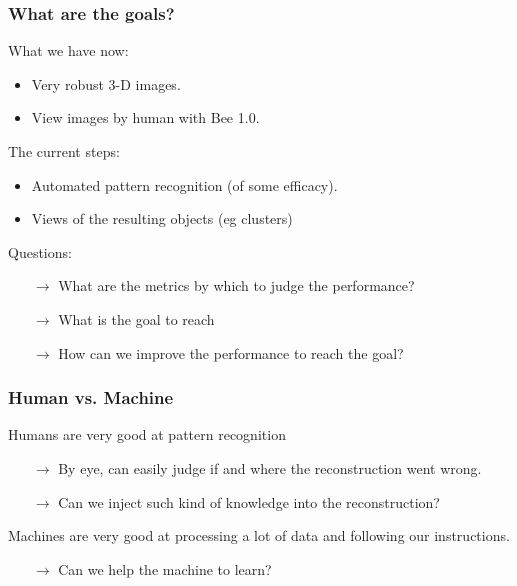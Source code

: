 \documentclass[xcolor=dvipsnames]{beamer}
\begin{document}
\begin{frame}
  \frametitle{What are the goals?}
  What we have now:
  \begin{itemize}
  \item Very robust 3-D images.
  \item View images by human with Bee 1.0.
  \end{itemize}

  The current steps:
  \begin{itemize}
  \item Automated pattern recognition (of some efficacy).
  \item Views of the resulting objects (eg clusters)
  \end{itemize}

  Questions:
  \begin{itemize}
  \item[$\rightarrow$]  What are the metrics by which to judge the performance?
  \item[$\rightarrow$]  What is the goal to reach
  \item[$\rightarrow$]  How can we improve the performance to reach the goal?
  \end{itemize}

\end{frame}

\begin{frame}
  \frametitle{Human vs. Machine}
  Humans are very good at pattern recognition
  \begin{itemize}
  \item[$\rightarrow$] By eye, can easily judge if and where the reconstruction
went wrong.
  \item[$\rightarrow$] Can we inject such kind of knowledge into the
reconstruction?
  \end{itemize}

  \vfill

  Machines are very good at processing a lot of
  data and following our instructions.
  \begin{itemize}
  \item[$\rightarrow$] Can we help the machine to learn?
  \end{itemize}
\end{frame}
\end{document}

